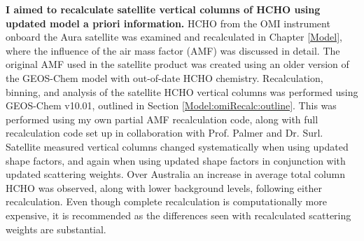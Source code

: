   \textbf{I aimed to recalculate satellite vertical columns of HCHO using updated model a priori information.}
  HCHO from the OMI instrument onboard the Aura satellite %
  was examined and recalculated in Chapter \ref{Model}, where the influence of the air mass factor (AMF) was discussed in detail. %
  The original AMF used in the satellite product was created using an older version of the GEOS-Chem model with out-of-date HCHO chemistry.
  Recalculation, binning, and analysis of the satellite HCHO vertical columns was performed using GEOS-Chem v10.01, outlined in Section \ref{Model:omiRecalc:outline}.
  This was performed using my own partial AMF recalculation code, along with full recalculation code set up in collaboration with Prof. Palmer and Dr. Surl.
  Satellite measured vertical columns changed systematically when using updated shape factors, and again when using updated shape factors in conjunction with updated scattering weights.
  Over Australia an increase in average total column HCHO was observed, along with lower background levels, following either recalculation.
  Even though complete recalculation is computationally more expensive, it is recommended as the differences seen with recalculated scattering weights are substantial.
  
